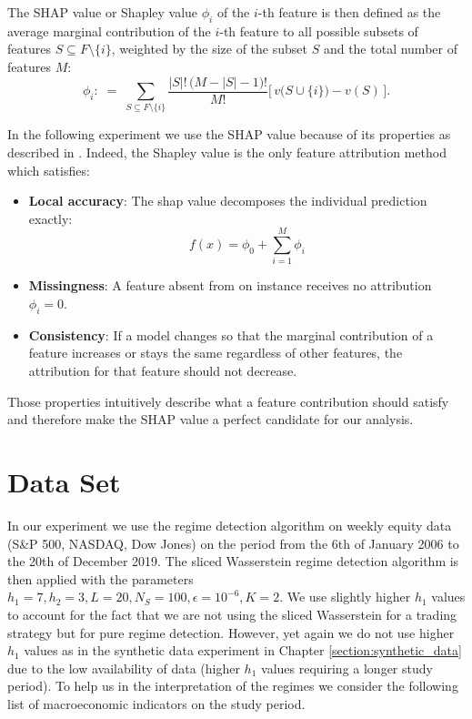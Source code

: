 \documentclass[12pt,a4paper]{report}
\begin{document}
The SHAP value or Shapley value $\phi_i$ of the $i$-th feature is then defined as the average marginal contribution of the $i$-th feature to all possible subsets of features $S \subseteq F\setminus\{i\}$, weighted by the size of the subset $S$ and the total number of features $M$: 
\begin{equation}
  \phi_i :\;=\; \sum_{S \subseteq F\setminus\{i\}} 
  \frac{|S|!\,\big(M-|S|-1\big)!}{M!}
  \Big[\,v\big(S\cup\{i\}\big) - v(S)\,\Big].
  \label{eq:shap-value}
\end{equation}
 
In the following experiment we use the SHAP value because of its properties as described in \cite{lundberg2017unified}.
Indeed, the Shapley value is the only feature attribution method which satisfies: 
\begin{itemize}
  \item \textbf{Local accuracy}: The shap value decomposes the individual prediction exactly:
   \begin{equation}
   f(x) = \phi_0 + \sum_{i=1}^M \phi_i
    \end{equation}    
   \item\textbf{Missingness}: A feature absent from on instance receives no attribution $\phi_i = 0$.
   \item \textbf{Consistency}: If a model changes so that the marginal contribution of a feature increases or stays the same regardless of other features, the attribution for that feature should not decrease.
\end{itemize}

Those properties intuitively describe what a feature contribution should satisfy and therefore make the SHAP value a perfect candidate for our analysis. 


\section{Data Set}
In our experiment we use the regime detection algorithm on weekly equity data (S\&P 500, NASDAQ, Dow Jones) on the period from the 6th of January 2006 to the 20th of December 2019. 
The sliced Wasserstein regime detection algorithm is then applied with the parameters $h_1 = 7, h_2 = 3, L = 20, N_S = 100, \epsilon = 10^{-6}, K = 2$.
We use slightly higher $h_1$ values to account for the fact that we are not using the sliced Wasserstein for a trading strategy but for pure regime detection. 
However, yet again we do not use higher $h_1$ values as in the synthetic data experiment in Chapter \ref{section:synthetic_data} due to the low availability of data (higher $h_1$ values requiring a longer study period).
To help us in the interpretation of the regimes we consider the following list of macroeconomic indicators on the study period.
\end{document}
